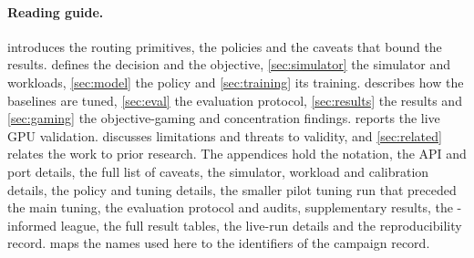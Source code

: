 \paragraph{Reading guide.}
 introduces the routing primitives, the policies and the caveats that bound
the results.  defines the decision and the objective, \cref{sec:simulator} the
simulator and workloads, \cref{sec:model} the policy and \cref{sec:training} its training.
 describes how the baselines are tuned, \cref{sec:eval} the evaluation protocol,
\cref{sec:results} the results and \cref{sec:gaming} the objective-gaming and concentration findings.
 reports the live GPU validation.  discusses limitations and threats
to validity, and \cref{sec:related} relates the work to prior research. The appendices hold the
notation, the API and port details, the full list of caveats, the simulator, workload and
calibration details, the policy and tuning details, the smaller pilot tuning run that preceded the
main tuning, the evaluation protocol and audits, supplementary results, the \ais{}-informed league,
the full result tables, the live-run details and the reproducibility record.
 maps the names used here to the identifiers of the campaign record.
